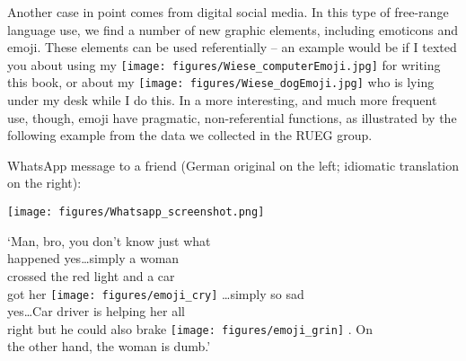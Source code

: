 Another case in point comes from digital social media. In this type of free-range language use, we find a number of new graphic elements, including emoticons and emoji. These elements can be used referentially – an example would be if I texted you about using my
\texttt{[image: figures/Wiese\_computerEmoji.jpg]}
  for writing this book, or about my
\texttt{[image: figures/Wiese\_dogEmoji.jpg]}
  who is lying under my desk while I do this. In a more interesting, and much more frequent use, though, emoji have pragmatic, non-referential functions, as illustrated by the following example from the data we collected in the RUEG group.


\ea\label{ex:Whatsapp} WhatsApp message to a friend (German original on the left; idiomatic translation on the right):

 \begin{minipage}{0.4\textwidth}
    \hspace*{-5mm}\texttt{[image: figures/Whatsapp\_screenshot.png]}
    \end{minipage}
    \hfill
\begin{minipage}{0.45\textwidth}
        ‘Man, bro, you don’t know just what\\
        happened yes\dots simply a woman\\
        crossed the red light and a car\\
        got her {\texttt{[image: figures/emoji\_cry]}} \dots simply so sad\\
        yes\dots Car driver is helping her all\\
        right but he could also brake {\texttt{[image: figures/emoji\_grin]}} . On\\
        the other hand, the woman is dumb.’
    \end{minipage}
\z

